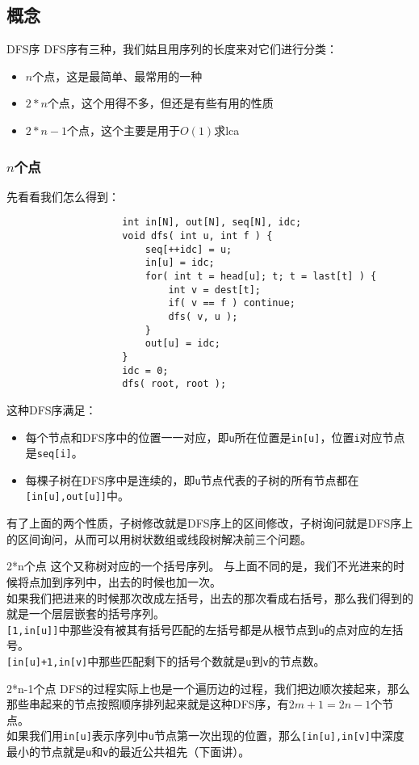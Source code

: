 \documentclass{beamer}
\begin{document}
		\subsection{概念}
			\begin{frame}{DFS序}
				DFS序有三种，我们姑且用序列的长度来对它们进行分类：
				\begin{itemize}
					\item $n$个点，这是最简单、最常用的一种
					\item $2*n$个点，这个用得不多，但还是有些有用的性质
					\item $2*n - 1$个点，这个主要是用于$O(1)$求lca  
				\end{itemize}
			\end{frame}
			\begin{frame}[fragile=singleslide]
				\frametitle{$n$个点}
				先看看我们怎么得到：\\
				\begin{verbatim}
					int in[N], out[N], seq[N], idc;
					void dfs( int u, int f ) {
					    seq[++idc] = u;
					    in[u] = idc;
					    for( int t = head[u]; t; t = last[t] ) {
					        int v = dest[t];
					        if( v == f ) continue;
					        dfs( v, u );
					    }
					    out[u] = idc;
					}
					idc = 0;
					dfs( root, root );
				\end{verbatim}
			\end{frame}
			\begin{frame}
				这种DFS序满足：
				\begin{itemize}
					\item 每个节点和DFS序中的位置一一对应，即\texttt{u}所在位置是\texttt{in[u]}，位置\texttt{i}对应节点是\texttt{seq[i]}。
					\item 每棵子树在DFS序中是连续的，即\texttt{u}节点代表的子树的所有节点都在\texttt{[in[u],out[u]]}中。
				\end{itemize}
				有了上面的两个性质，子树修改就是DFS序上的区间修改，子树询问就是DFS序上的区间询问，从而可以用树状数组或线段树解决前三个问题。
			\end{frame}
			\begin{frame}{2*n个点}
				这个又称树对应的一个括号序列。
				与上面不同的是，我们不光进来的时候将点加到序列中，出去的时候也加一次。\\ 
				如果我们把进来的时候那次改成左括号，出去的那次看成右括号，那么我们得到的就是一个层层嵌套的括号序列。 \\
				\texttt{[1,in[u]]}中那些没有被其有括号匹配的左括号都是从根节点到\texttt{u}的点对应的左括号。\\
				\texttt{[in[u]+1,in[v]}中那些匹配剩下的括号个数就是\texttt{u}到\texttt{v}的节点数。
			\end{frame} 
			\begin{frame}{2*n-1个点}
				DFS的过程实际上也是一个遍历边的过程，我们把边顺次接起来，那么那些串起来的节点按照顺序排列起来就是这种DFS序，有$2m + 1 = 2n - 1$个节点。\\
				如果我们用\texttt{in[u]}表示序列中\texttt{u}节点第一次出现的位置，那么\texttt{[in[u],in[v]}中深度最小的节点就是\texttt{u}和\texttt{v}的最近公共祖先（下面讲）。
			\end{frame} 
\end{document}

